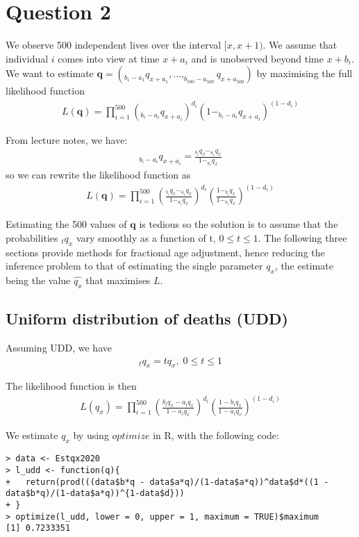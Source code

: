 \documentclass[a4paper,11pt]{article}
\theoremstyle{mytheor}
\begin{document}
\section*{Question 2}

We observe 500 independent lives over the interval $[x,x+1)$. We assume that individual $i$ comes into view at time $x+a_i$ and is unobserved beyond time $x+b_i$. We want to estimate $\textbf{q} = (_{b_1-a_1}q_{x+a_1}, ... ,_{b_{500}-a_{500}}q_{x+a_{500}})$ by maximising the full likelihood function 
\begin{align*}
    L(\textbf{q}) = \prod_{i = 1}^{500}(_{b_i-a_i}q_{x+a_i})^{d_i}(1-_{b_i-a_i}q_{x+a_i})^{(1-d_i)}
\end{align*}

From lecture notes, we have:
\begin{align*}
   _{b_i-a_i}q_{x+a_i} = \frac{_{b_i}q_x - _{a_i}q_x}{1 - _{a_i}q_x}
\end{align*}
so we can rewrite the likelihood function as
\begin{align*}
    L(\textbf{q}) = \prod_{i = 1}^{500}\left(\frac{_{b_i}q_x - _{a_i}q_x}{1 - _{a_i}q_x}\right)^{d_i}\left(\frac{1 - _{b_i}q_x}{1 - _{a_i}q_x}\right)^{(1-d_i)}
\end{align*}

Estimating the 500 values of $\textbf{q}$ is tedious so the solution is to assume that the probabilities $_tq_x$ vary smoothly as a function of t, $0\leq t \leq 1$. The following three sections provide methods for fractional age adjustment, hence reducing the inference problem to that of estimating the single parameter $q_x$, the estimate being the value $\hat{q_x}$ that maximises $L$.

\subsection*{Uniform distribution of deaths (UDD)}

Assuming UDD, we have 
\begin{align*}
    _tq_x = tq_x, \; 0 \leq t \leq 1
\end{align*}

The likelihood function is then
\begin{align*}
    L(q_x) = \prod_{i = 1}^{500}\left(\frac{b_iq_x - a_iq_x}{1 - a_iq_x}\right)^{d_i}\left(\frac{1 - b_iq_x}{1 - a_iq_x}\right)^{(1-d_i)}
\end{align*}

We estimate $q_x$ by using $optimize$ in R, with the following code:
\begin{lstlisting}[label={list:first},caption=Code to estimate $q_x$ under the UDD assumption]
> data <- Estqx2020
> l_udd <- function(q){
+   return(prod(((data$b*q - data$a*q)/(1-data$a*q))^data$d*((1 - data$b*q)/(1-data$a*q))^{1-data$d}))
+ }
> optimize(l_udd, lower = 0, upper = 1, maximum = TRUE)$maximum
[1] 0.7233351
\end{lstlisting}
\end{document}
